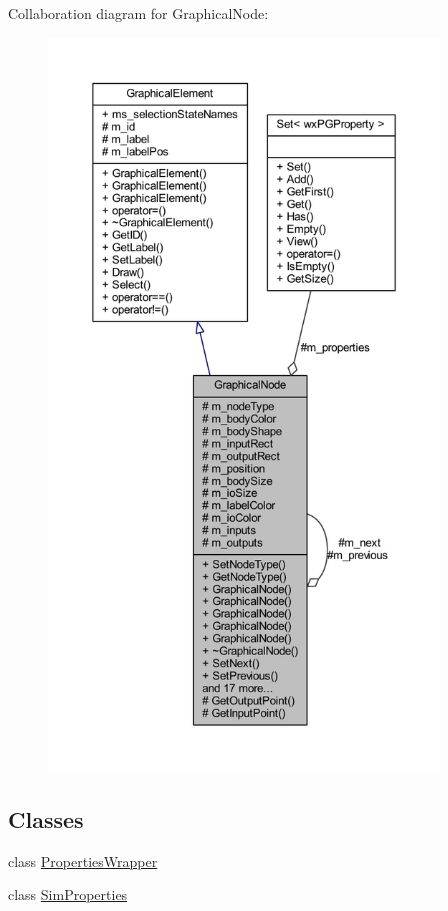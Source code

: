 Collaboration diagram for Graphical\+Node\+:
\nopagebreak
\begin{figure}[H]
\begin{center}
\leavevmode
\includegraphics[height=550pt]{class_graphical_node__coll__graph}
\end{center}
\end{figure}
\subsection*{Classes}
\begin{DoxyCompactItemize}
\item 
class \hyperlink{class_graphical_node_1_1_properties_wrapper}{Properties\+Wrapper}
\item 
class \hyperlink{class_graphical_node_1_1_sim_properties}{Sim\+Properties}
\end{DoxyCompactItemize}
